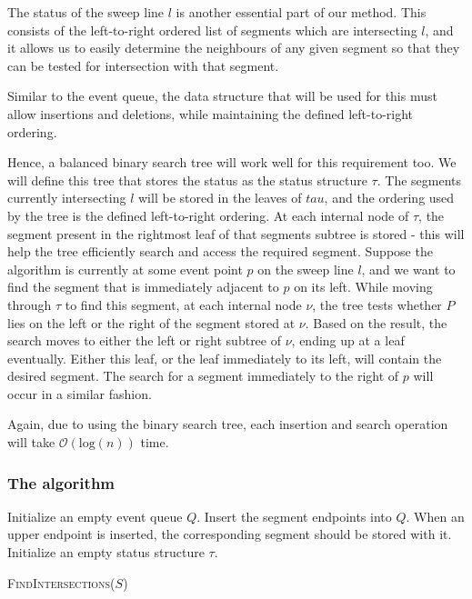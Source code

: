 \documentclass{article}
\begin{document}
The status of the sweep line $l$ is another essential part of our method. This consists of the left-to-right ordered list of segments which are intersecting $l$, and it allows us to easily determine the neighbours of any given segment so that they can be tested for intersection with that segment.

Similar to the event queue, the data structure that will be used for this must allow insertions and deletions, while maintaining the defined left-to-right ordering.

Hence, a balanced binary search tree will work well for this requirement too. We will define this tree that stores the status as the status structure $\tau$. The segments currently intersecting $l$ will be stored in the leaves of $tau$, and the ordering used by the tree is the defined left-to-right ordering. At each internal node of $\tau$, the segment present in the rightmost leaf of that segments subtree is stored - this will help the tree efficiently search and access the required segment.  
Suppose the algorithm is currently at some event point $p$ on the sweep line $l$, and we want to find the segment that is immediately adjacent to $p$ on its left. While moving through $\tau$ to find this segment, at each internal node $\nu$, the tree tests whether $P$ lies on the left or the right of the segment stored at $\nu$. Based on the result, the search moves to either the left or right subtree of $\nu$, ending up at a leaf eventually. Either this leaf, or the leaf immediately to its left, will contain the desired segment. The search for a segment immediately to the right of $p$ will occur in a similar fashion.

Again, due to using the binary search tree, each insertion and search operation will take $\mathcal{O}(\text{log}(n))$ time.

\subsubsection{The algorithm}

\begin{algorithm}[H]
\DontPrintSemicolon 
{}
Initialize an empty event queue $Q$.\;
Insert the segment endpoints into $Q$. When an upper endpoint is inserted, the corresponding segment should be stored with it.\;
Initialize an empty status structure $\tau$.\;
\caption{\textsc{FindIntersections}($S$)}
\end{algorithm}
\end{document}

